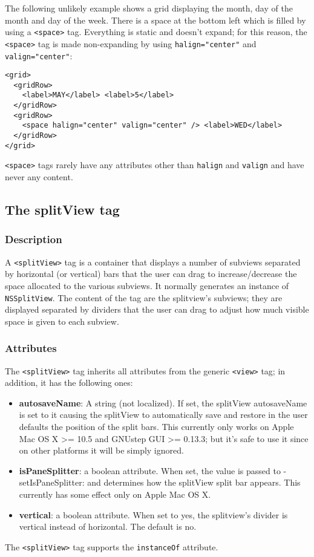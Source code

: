 The following unlikely example shows a grid displaying the month, day
of the month and day of the week.  There is a space at the bottom left
which is filled by using a \texttt{<space>} tag.  Everything is static
and doesn't expand; for this reason, the \texttt{<space>} tag is made
non-expanding by using \texttt{halign="center"} and
\texttt{valign="center"}:
\begin{verbatim}
<grid>
  <gridRow>
    <label>MAY</label> <label>5</label>
  </gridRow>
  <gridRow>
    <space halign="center" valign="center" /> <label>WED</label>
  </gridRow>
</grid>
\end{verbatim}

\texttt{<space>} tags rarely have any attributes other than
\texttt{halign} and \texttt{valign} and have never any content.

\subsection{The splitView tag}

\subsubsection{Description}

A \texttt{<splitView>} tag is a container that displays a number of
subviews separated by horizontal (or vertical) bars that the user can
drag to increase/decrease the space allocated to the various subviews.
It normally generates an instance of \texttt{NSSplitView}.  The
content of the tag are the splitview's subviews; they are displayed
separated by dividers that the user can drag to adjust how much
visible space is given to each subview.

\subsubsection{Attributes}
The \texttt{<splitView>} tag inherits all attributes from the generic
\texttt{<view>} tag; in addition, it has the following ones:
\begin{itemize}
\item {\bf autosaveName}: A string (not localized).  If set, the
  splitView autosaveName is set to it causing the splitView to
  automatically save and restore in the user defaults the position of
  the split bars.  This currently only works on Apple Mac OS X >= 10.5
  and GNUstep GUI >= 0.13.3; but it's safe to use it since on other
  platforms it will be simply ignored.
\item {\bf isPaneSplitter}: a boolean attribute.  When set, the value
  is passed to -setIsPaneSplitter: and determines how the splitView
  split bar appears.  This currently has some effect only on Apple Mac
  OS X.
\item {\bf vertical}: a boolean attribute.  When set to yes, the
  splitview's divider is vertical instead of horizontal.  The default
  is no.
\end{itemize}
The \texttt{<splitView>} tag supports the \texttt{instanceOf} attribute.

